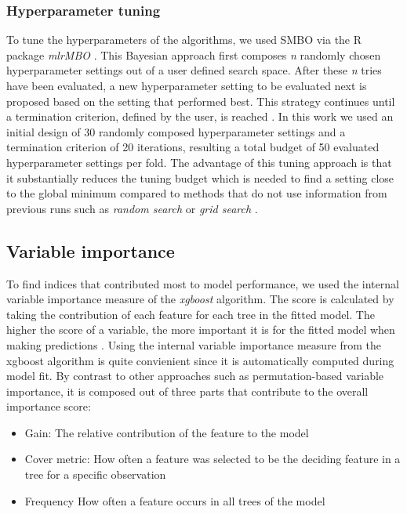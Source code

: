 \documentclass[review]{elsarticle}
\begin{document}

\subsubsection{Hyperparameter tuning}
To tune the hyperparameters of the algorithms, we used \ac{SMBO} via the R package \textit{mlrMBO} \citep{mlrMBO}.
This Bayesian approach first composes \textit{n} randomly chosen hyperparameter settings out of a user defined search space.
After these \textit{n} tries have been evaluated, a new hyperparameter setting to be evaluated next is proposed based on the setting that performed best.
This strategy continues until a termination criterion, defined by the user, is reached \citep{Hutter2011, Jones1998}.
In this work we used an initial design of 30 randomly composed hyperparameter settings and a termination criterion of 20 iterations, resulting a total budget of 50 evaluated hyperparameter settings per fold.
The advantage of this tuning approach is that it substantially reduces the tuning budget which is needed to find a setting close to the global minimum compared to methods that do not use information from previous runs such as \textit{random search} or \textit{grid search} \citep{Bergstra2012}.

\subsection{Variable importance}

To find indices that contributed most to model performance, we used the internal variable importance measure of the \textit{xgboost} algorithm.
The score is calculated by taking the contribution of each feature for each tree in the fitted model.
The higher the score of a variable, the more important it is for the fitted model when making predictions \citep{chenXGBoostScalableTree2016}.
Using the internal variable importance measure from the xgboost algorithm is quite convienient since it is automatically computed during model fit.
By contrast to other approaches such as permutation-based variable importance, it is composed out of three parts that contribute to the overall importance score:

\begin{itemize}
	\item Gain: The relative contribution of the feature to the model 
	\item Cover metric: How often a feature was selected to be the deciding feature in a tree for a specific observation 
	\item Frequency How often a feature occurs in all trees of the model 
\end{itemize}
\end{document}
